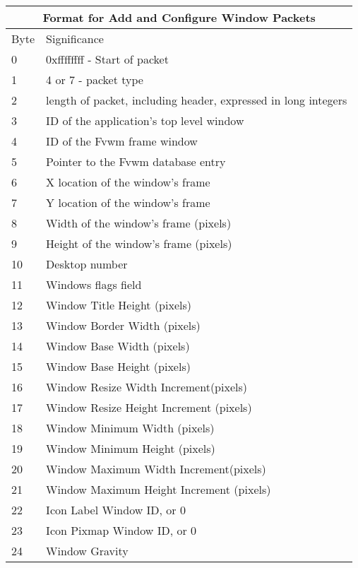 \begin{table}
\begin{center}
\begin{tabular}[h]{|l|l|} \hline
\multicolumn{2}{|c|}{Format for Add and Configure Window Packets} \\ \hline
Byte &Significance \\\hline
0    & 0xffffffff - Start of packet \\
1    & 4 or 7 - packet type \\
2    & length of packet, including header, expressed in long integers
\\ \hline
3    & ID of the application's top level window \\
4    & ID of the Fvwm frame window \\
5    & Pointer to the Fvwm database entry \\
6    & X location of the window's frame \\
7    & Y location of the window's frame\\
8    & Width of the window's frame (pixels) \\
9    & Height of the window's frame (pixels) \\
10   & Desktop number\\ 
11   & Windows flags field\\
12   & Window Title Height (pixels) \\
13   & Window Border Width (pixels) \\
14   & Window Base Width (pixels) \\  
15   & Window Base Height (pixels) \\  
16   & Window Resize Width Increment(pixels) \\  
17   & Window Resize Height Increment (pixels) \\  
18   & Window Minimum Width (pixels) \\  
19   & Window Minimum Height (pixels) \\  
20   & Window Maximum Width Increment(pixels) \\  
21   & Window Maximum Height Increment (pixels) \\
22   & Icon Label Window ID, or 0\\
23   & Icon Pixmap Window ID, or 0\\ 
24   & Window Gravity\\  \hline
\end{tabular}
\end{center}
\end{table}


